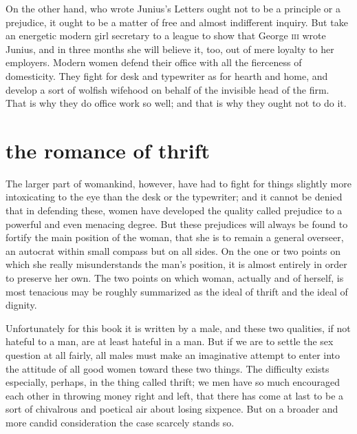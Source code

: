 \documentclass[final,10pt,letterpaper,twocolumn,openany]{book}
\begin{document}
On the other hand, who wrote Junius's Letters
ought not to be a principle or a prejudice, it ought to be a matter of free
and almost indifferent inquiry. But take an energetic modern girl secretary
to a league to show that George \textsc{iii} wrote Junius, and in three months she
will believe it, too, out of mere loyalty to her employers. Modern women
defend their office with all the fierceness of domesticity. They fight for
desk and typewriter as for hearth and home, and develop a sort of wolfish
wifehood on behalf of the invisible head of the firm. That is why they do
office work so well; and that is why they ought not to do it.

\section{the romance of thrift}

     The larger part of womankind, however, have had to fight for things
slightly more intoxicating to the eye than the desk or the typewriter; and it
cannot be denied that in defending these, women have developed the
quality called prejudice to a powerful and even menacing degree. But
these prejudices will always be found to fortify the main position of the
woman, that she is to remain a general overseer, an autocrat within small
compass but on all sides. On the one or two points on which she really
misunderstands the man's position, it is almost entirely in order to preserve
her own. The two points on which woman, actually and of herself, is most
tenacious may be roughly summarized as the ideal of thrift and the ideal of
dignity.

Unfortunately for this book it is written by a male, and these two
qualities, if not hateful to a man, are at least hateful in a man. But if we are
to settle the sex question at all fairly, all males must make an imaginative
attempt to enter into the attitude of all good women toward these two
things. The difficulty exists especially, perhaps, in the thing called thrift;
we men have so much encouraged each other in throwing money right and
left, that there has come at last to be a sort of chivalrous and poetical air
about losing sixpence. But on a broader and more candid consideration the
case scarcely stands so.
\end{document}
